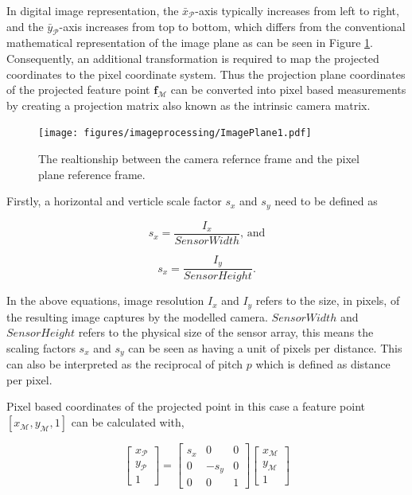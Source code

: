 In digital image representation, the $\bar{x}_\mathcal{P}$-axis typically increases from left to right, and the $\bar{y}_\mathcal{P}$-axis increases from top to bottom, which differs from
the conventional mathematical representation of the image plane as can be seen in Figure \ref{fig:PixelPlane}. Consequently, an additional transformation is required to map the projected coordinates to the pixel 
coordinate system. Thus the projection plane coordinates of the projected feature point $\mathbf{f}_\mathcal{M}$ can be converted into pixel based measurements by creating a projection matrix also known as
the intrinsic camera matrix.

\begin{figure}[H]
    \centering
    \texttt{[image: figures/imageprocessing/ImagePlane1.pdf]}
    \caption{The realtionship between the camera refernce frame and the pixel plane reference frame.}
    \label{fig:PixelPlane}
\end{figure}

\noindent
Firstly, a horizontal and verticle scale factor $s_x$ and $s_y$ need to be defined as 

\begin{equation}
    s_x = \frac{I_x}{SensorWidth}
    \text{, and}
\end{equation}

\begin{equation}
    s_x = \frac{I_y}{SensorHeight}
    \text{.}
\end{equation}

\noindent 
In the above equations, image resolution $I_x$ and $I_y$ refers to the size, in pixels, of the resulting image captures by the modelled camera. $SensorWidth$ and $SensorHeight$ refers to the physical
size of the sensor array, this means the scaling factors $s_x$ and $s_y$ can be seen as having a unit of pixels per distance. This can also be interpreted as the reciprocal of pitch 
$p$ which is defined as distance per pixel.
\vspace{0.5cm}

\noindent
Pixel based coordinates of the projected point in this case a feature point $[x_\mathcal{M}, y_\mathcal{M},1]$ can be calculated with,

\begin{equation}
    \begin{bmatrix}
    x_\mathcal{P} \\
    y_\mathcal{P} \\
    1    
    \end{bmatrix}
    =
    \begin{bmatrix}
        s_x & 0  & 0 \\
        0 & -s_y & 0 \\
        0 & 0 & 1
    \end{bmatrix}
    \begin{bmatrix}
        x_\mathcal{M} \\ 
        y_\mathcal{M} \\
        1
    \end{bmatrix}
    \label{Eq:PM}
\end{equation}


